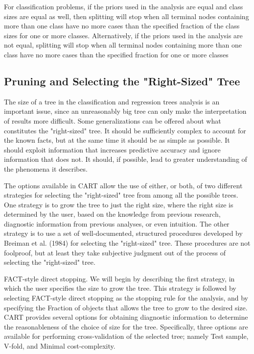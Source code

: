  For classification problems, if the priors used in the analysis are equal and class sizes are equal as well, then splitting will stop when all terminal nodes containing more than one class have no more cases than the specified fraction of the class sizes for one or more classes. Alternatively, if the priors used in the analysis are not equal, splitting will stop when all terminal nodes containing more than one class have no more cases than the specified fraction for one or more classes

\subsection{Pruning and Selecting the "Right-Sized" Tree}

The size of a tree in the classification and regression trees analysis is an important issue, since an unreasonably big tree can only make the interpretation of results more difficult. Some generalizations can be offered about what constitutes the "right-sized" tree. It should be sufficiently complex to account for the known facts, but at the same time it should be as simple as possible. It should exploit information that increases predictive accuracy and ignore information that does not. It should, if possible, lead to greater understanding of the phenomena it describes.

 The options available in CART allow the use of either, or both, of two different strategies for selecting the "right-sized" tree from among all the possible trees. One strategy is to grow the tree to just the right size, where the right size is determined by the user, based on the knowledge from previous research, diagnostic information from previous analyses, or even intuition. The other strategy is to use a set of well-documented, structured procedures developed by Breiman et al. (1984) for selecting the "right-sized" tree. These procedures are not foolproof, but at least they take subjective judgment out of the process of selecting the "right-sized" tree.

FACT-style direct stopping. We will begin by describing the first strategy, in which the user specifies the size to grow the tree. This strategy is followed by selecting FACT-style direct stopping as the stopping rule for the analysis, and by specifying the Fraction of objects that allows the tree to grow to the desired size. CART provides several options for obtaining diagnostic information to determine the reasonableness of the choice of size for the tree. Specifically, three options are available for performing cross-validation of the selected tree; namely Test sample, V-fold, and Minimal cost-complexity.

